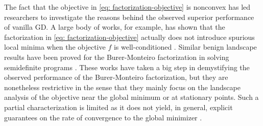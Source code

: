\documentclass[11pt]{article}
\newcommand{\0}{{\mathbf{0}}}
\newcommand{\1}{{\mathbf{1}}}
\begin{document}
The fact that the objective in \eqref{eq: factorization-objective} is nonconvex has led researchers to investigate the reasons behind the observed superior performance of vanilla GD. A large body of works, for example, has shown that the factorization in \eqref{eq: factorization-objective} actually does not introduce spurious local minima when the objective $f$ is well-conditioned  \cite{bhojanapalli2016global,chen2019model,ge2017no,li2019non,park2017non,zhang2021general,zhang2019sharp,zhang2018primal,zhu2018global}. Similar benign landscape results have been proved for the Burer-Monteiro factorization in solving semidefinite programs \cite{boumal2020deterministic,journee2010low,mei2017solving,ling2019landscape,waldspurger2020rank}. These works have taken a big step in demystifying the observed performance of the Burer-Monteiro factorization, but they are nonetheless restrictive in the sense that they mainly focus on the landscape analysis of the objective near the global minimum or at stationary points. Such a partial characterization is limited as it does not yield, in general, explicit guarantees on the rate of convergence to the global minimizer \cite{du2017gradient,ge2015escaping,lee2019first}. 
\end{document}
